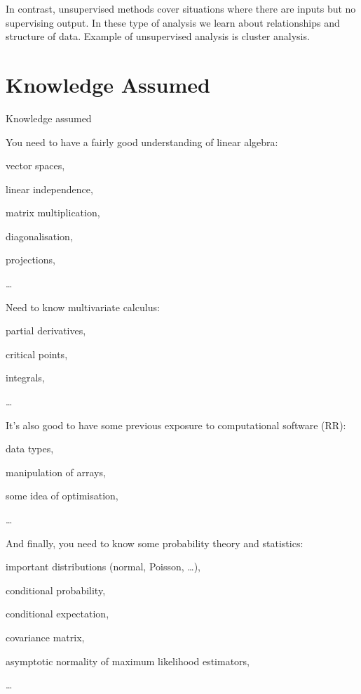 \documentclass[11pt]{article}
\begin{document}
In contrast, unsupervised methods cover situations where there are inputs but no supervising output.
In these type of analysis we learn about relationships and structure of data.
Example of unsupervised analysis is cluster analysis.
\blindtext

\section{Knowledge Assumed}\label{sec:Knowledge-Assumed}
Knowledge assumed

You need to have a fairly good understanding of linear algebra:
\begin{list}
    \item vector spaces,
    \item linear independence,
    \item matrix multiplication,
    \item diagonalisation,
    \item projections,
    \item \ldots
\end{list}

Need to know multivariate calculus:
\begin{list}
    \item partial derivatives,
    \item critical points,
    \item integrals,
    \item \ldots
\end{list}

It's also good to have some previous exposure to computational software (RR):
\begin{list}
    \item data types,
    \item manipulation of arrays,
    \item some idea of optimisation,
    \item \ldots
\end{list}

And finally, you need to know some probability theory and statistics:
\begin{list}
    \item important distributions (normal, Poisson, …),
    \item conditional probability,
    \item conditional expectation,
    \item covariance matrix,
    \item asymptotic normality of maximum likelihood estimators,
    \item \ldots
\end{list}
\blindtext
\end{document}
